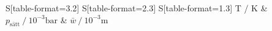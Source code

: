 \begin{table}
    \centering
    \caption{Bestimmung der Sättigungsdampfdrücke sowie der mittleren Weglängen.}
    \label{tab:0}
    \begin{tabular}{
	S[table-format=3.2]
	S[table-format=2.3]
	S[table-format=1.3]
	}
	\toprule
	{T  /  \si{\kelvin}}		& {$p_{\text{sätt}} \:/\: 10^{-3} \si{\bar}$}		& 
	{$\bar{w} \:/\: 10^{-3} \si{\metre} $}		\\ 
	\midrule
    
    \bottomrule
    \end{tabular}
    \end{table}

